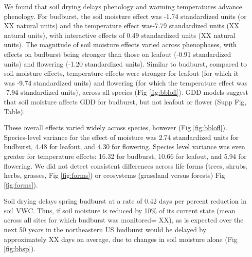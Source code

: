 \documentclass{article}
\begin{document}
\par We found that soil drying delays phenology and warming temperatures advance phenology. For budburst, the soil moisture effect was -1.74 standardized units (or XX natural units) and the temperature effect was-7.79 standardized units (XX natural units), with interactive effects of 0.49 standardized units (XX natural units). The magnitude of soil moisture effects varied across phenophases, with effects on budburst being stronger than those on leafout (-0.91 standardized units) and flowering (-1.20 standardized units). Similar to budburst, compared to soil moisture effects, temperature effects were stronger for leafout (for which it was -9.74 standardized units) and flowering (for which the temperature effect was -7.94 standardized units), across all species (Fig \ref{fig:bblofl}). GDD models suggest that soil moisture affects GDD for budburst, but not leafout or flower (Supp Fig, Table).%
\par These overall effects varied widely across species, however (Fig \ref{fig:bblofl}). Species-level variance for the effect of moisture was 2.74 standardized units for budburst, 4.48 for leafout, and 4.30 for flowering. Species level variance was even greater for temperature effects: 16.32 for budburst, 10.66 for leafout, and 5.94 for flowering.
We did not detect consistent differences across life forms (trees, shrubs, herbs, grasses, Fig \ref{fig:forms}) or ecosystems (grassland versus forests) Fig \ref{fig:forms}).

\par Soil drying delays spring budburst at a rate of 0.42 days per percent reduction in soil VWC. Thus, if soil moisture is reduced by 10\% of its current state (mean across all sites for which budburst was monitored= XX), as is expected over the next 50 years in the northeastern US \citep{berg2017} budburst would be delayed by approximately XX days on average, due to changes in soil moisture alone (Fig \ref{fig:bbsp}).



\end{document}
